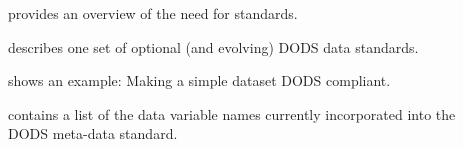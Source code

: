 \begin{description}

\item[\bf{}] provides an overview of the need for
  standards. 
  
\item[\bf{}] describes one set of optional (and
  evolving) DODS data standards.

\item[\bf{}] shows an example: Making a simple
  dataset DODS compliant.

\item[\bf{}] contains a list of the data variable
  names currently incorporated into the DODS meta-data standard.

\end{description}


\listconventions




